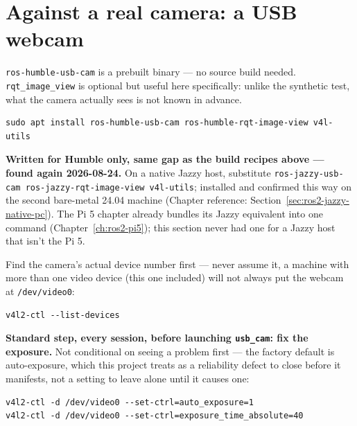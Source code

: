\documentclass[11pt]{report}
\begin{document}
\section{Against a real camera: a USB webcam}
\label{sec:ros2-realcam}

\texttt{ros-humble-usb-cam} is a prebuilt binary --- no source build needed.
\texttt{rqt\_image\_view} is optional but useful here specifically: unlike
the synthetic test, what the camera actually sees is not known in advance.

\begin{lstlisting}[style=shell]
sudo apt install ros-humble-usb-cam ros-humble-rqt-image-view v4l-utils
\end{lstlisting}

\textbf{Written for Humble only, same gap as the build recipes above ---
found again 2026-08-24.} On a native Jazzy host, substitute
\texttt{ros-jazzy-usb-cam ros-jazzy-rqt-image-view v4l-utils}; installed
and confirmed this way on the second bare-metal 24.04 machine (Chapter
reference: Section~\ref{sec:ros2-jazzy-native-pc}). The Pi 5 chapter
already bundles its Jazzy equivalent into one command
(Chapter~\ref{ch:ros2-pi5}); this section never had one for a Jazzy host
that isn't the Pi 5.

Find the camera's actual device number first --- never assume it, a machine
with more than one video device (this one included) will not always put the
webcam at \texttt{/dev/video0}:

\begin{lstlisting}[style=shell]
v4l2-ctl --list-devices
\end{lstlisting}

\textbf{Standard step, every session, before launching \texttt{usb\_cam}:
fix the exposure.} Not conditional on seeing a problem first --- the factory
default is auto-exposure, which this project treats as a reliability defect
to close before it manifests, not a setting to leave alone until it causes
one:

\begin{lstlisting}[style=shell]
v4l2-ctl -d /dev/video0 --set-ctrl=auto_exposure=1
v4l2-ctl -d /dev/video0 --set-ctrl=exposure_time_absolute=40
\end{lstlisting}
\end{document}
